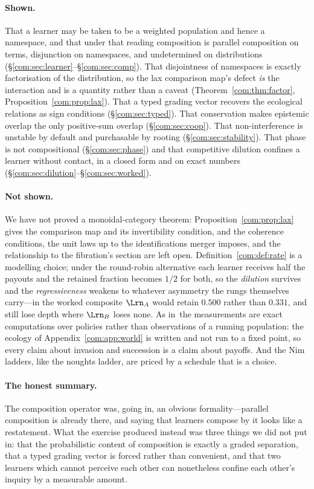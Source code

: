\paragraph{Shown.}
That a learner may be taken to be a weighted population and hence a namespace, and that under
that reading composition is parallel composition on terms, disjunction on namespaces, and
undetermined on distributions (\S\ref{com:sec:learner}--\S\ref{com:sec:comp}). That disjointness of
namespaces is exactly factorisation of the distribution, so the lax comparison map's defect
\emph{is} the interaction and is a quantity rather than a caveat (Theorem~\ref{com:thm:factor},
Proposition~\ref{com:prop:lax}). That a typed grading vector recovers the ecological relations as
sign conditions (\S\ref{com:sec:typed}). That conservation makes epistemic overlap the only
positive-sum overlap (\S\ref{com:sec:coop}). That non-interference is unstable by default and
purchasable by rooting (\S\ref{com:sec:stability}). That phase is not compositional
(\S\ref{com:sec:phase}) and that competitive dilution confines a learner without contact, in a closed
form and on exact numbers (\S\ref{com:sec:dilution}--\S\ref{com:sec:worked}).

\paragraph{Not shown.}
We have not proved a monoidal-category theorem: Proposition~\ref{com:prop:lax} gives the comparison
map and its invertibility condition, and the coherence conditions, the unit laws up to the
identifications merger imposes, and the relationship to the fibration's section are left open.
Definition~\ref{com:def:rate} is a modelling choice; under the round-robin alternative each learner
receives half the payouts and the retained fraction becomes $1/2$ for both, so the
\emph{dilution} survives and the \emph{regressiveness} weakens to whatever asymmetry the rungs
themselves carry---in the worked composite $\Lrn_A$ would retain $0.500$ rather than $0.331$, and
still lose depth where $\Lrn_B$ loses none. As in~\chGame the measurements are exact
computations over policies rather than observations of a running population: the ecology of
Appendix~\ref{com:app:world} is written and not run to a fixed point, so every claim about invasion
and succession is a claim about payoffs. And the Nim ladders, like the noughts ladder, are
priced by a schedule that is a choice.

\paragraph{The honest summary.}
The composition operator was, going in, an obvious formality---parallel composition is already
there, and saying that learners compose by it looks like a restatement. What the exercise
produced instead was three things we did not put in: that the probabilistic content of
composition is exactly a graded separation, that a typed grading vector is forced rather than
convenient, and that two learners which cannot perceive each other can nonetheless confine each
other's inquiry by a measurable amount.

